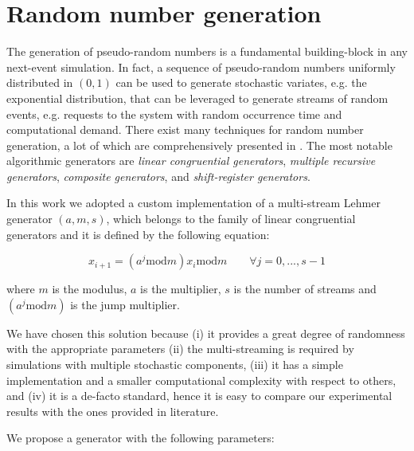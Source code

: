 \section{Random number generation}
\label{sec:random-number-generation}

The generation of pseudo-random numbers is a fundamental building-block in any next-event simulation.
%
In fact, a sequence of pseudo-random numbers uniformly distributed in $(0,1)$ can be used to generate stochastic variates, e.g. the exponential distribution, that can be leveraged to generate streams of random events, e.g. requests to the system with random occurrence time and computational demand.
%
There exist many techniques for random number generation, a lot of which are comprehensively presented in \cite{l1994uniform}.
The most notable algorithmic generators are \textit{linear congruential generators}, \textit{multiple recursive generators}, \textit{composite generators}, and \textit{shift-register generators}.

In this work we adopted a custom implementation of a multi-stream Lehmer generator $(a,m,s)$, which belongs to the family of linear congruential generators and it is defined by the following equation:

\begin{equation}
\label{eqn:lehmer}
x_{i+1} = (a^{j} \mathrm{mod}m) x_{i} \mathrm{mod}m \qquad\forall j=0,...,s-1
\end{equation}

where $m$ is the modulus, $a$ is the multiplier, $s$ is the number of streams and $(a^{j} \mathrm{mod}m)$ is the jump multiplier.

We have chosen this solution because 
(i) it provides a great degree of randomness with the appropriate parameters 
(ii) the multi-streaming is required by simulations with multiple stochastic components,
(iii) it has a simple implementation and a smaller computational complexity with respect to others, and 
(iv) it is a de-facto standard, hence it is easy to compare our experimental results with the ones provided in literature.

We propose a generator with the following parameters:

